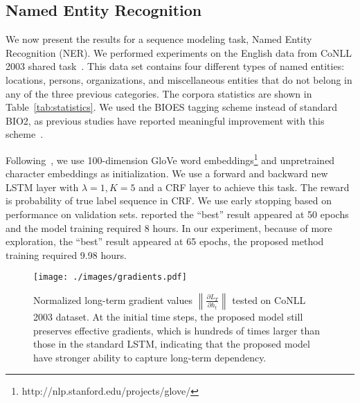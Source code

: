 \documentclass[letterpaper]{article} \usepackage{aaai19}  \usepackage{times}  \usepackage{helvet}  \usepackage{courier}  \usepackage{url}  \usepackage{graphicx}  \usepackage{amsmath}
\begin{document}
\subsection{Named Entity Recognition}
We now present the results for a sequence modeling task, Named Entity Recognition (NER). We performed experiments on the English data from CoNLL 2003 shared task~\cite{tjong2003introduction}. This data set contains four different types of named entities: locations, persons, organizations, and miscellaneous entities that do not belong in any of the three previous categories. The corpora statistics are shown in Table~\ref{tab:statistics}. We used the BIOES tagging scheme instead of standard BIO2, as previous studies have reported meaningful improvement with this scheme~\cite{lample2016neural,ma2016end}.



Following~\cite{ma2016end}, we use 100-dimension GloVe word embeddings\footnote{ http://nlp.stanford.edu/projects/glove/} and unpretrained character embeddings as initialization. We use a forward and backward new LSTM layer with $\lambda=1, K=5$ and a CRF layer to achieve this task. The reward is probability of true label sequence in CRF. We use early stopping based on performance on validation sets. \citeauthor{ma2016end}  reported the “best” result appeared at 50 epochs and the model training required 8 hours. In our experiment, because of more exploration, the “best” result appeared at 65 epochs, the proposed method training required 9.98 hours.

\begin{figure}[t]
\centering
  \texttt{[image: ./images/gradients.pdf]}
  \caption{Normalized long-term gradient values $\left \| \frac{\partial L_T}{\partial h_t} \right \|$ tested on CoNLL 2003 dataset. At the initial time steps, the proposed model still preserves effective gradients, which is hundreds of times larger than those in the standard LSTM, indicating that the proposed model have stronger ability to capture long-term dependency.} \label{fig:gradient}
\end{figure}
\end{document}
